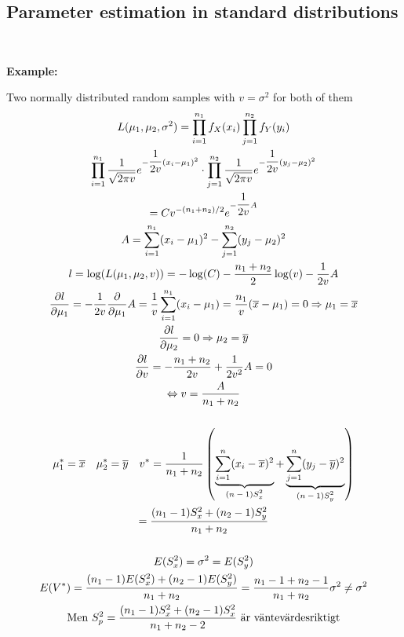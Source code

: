 \subsection{Parameter estimation in standard distributions}\hfill\\\par
\noindent\textbf{Example:}\par
\noindent Two normally distributed random samples with $v = \sigma^2$ for both of them
\begin{equation*}
  \begin{gathered}
    L(\mu_1,\mu_2,\sigma^2) = \prod_{i=1}^{n_1}f_X(x_i)\prod_{j=1}^{n_2}f_Y(y_i)\\
    \prod_{i=1}^{n_1}\dfrac{1}{\sqrt{2\pi v}}e^{-\dfrac{1}{2v}(x_i-\mu_1)^2}\cdot\prod_{j=1}^{n_2}\dfrac{1}{\sqrt{2\pi v}}e^{-\dfrac{1}{2v}(y_j-\mu_2)^2}\\
    = Cv^{-(n_1+n_2)/2}e^{-\dfrac{1}{2v}A}\\
    A = \sum_{i=1}^{n_1}(x_i-\mu_1)^2-\sum_{j=1}^{n_2}(y_j-\mu_2)^2\\
    l = \log(L(\mu_1,\mu_2,v)) = -\log(C)-\dfrac{n_1+n_2}{2}\log(v)-\dfrac{1}{2v}A\\
    \dfrac{\partial l}{\partial \mu_1} = -\dfrac{1}{2v}\dfrac{\partial}{\partial\mu_1}A = \dfrac{1}{v}\sum_{i=1}^{n_1}(x_i-\mu_1) = \dfrac{n_1}{v}(\overline{x}-\mu_1) = 0\Rightarrow \mu_1= \overline{x}\\
    \dfrac{\partial l}{\partial \mu_2} = 0\Rightarrow \mu_2 = \overline{y}\\
    \dfrac{\partial l}{\partial v} = -\dfrac{n_1+n_2}{2v}+\dfrac{1}{2v^2}A = 0\\
    \Leftrightarrow v = \dfrac{A}{n_1+n_2}\\\\
    \mu_1^* = \overline{x}\quad\mu_2^* = \overline{y}\quad v^* = \dfrac{1}{n_1+n_2}\left(\underbrace{\sum_{i=1}^{n}(x_i-\overline{x})^2}_{\text{$(n-1)S_x^2$}}+\underbrace{\sum_{j=1}^{n}(y_j-\overline{y})^2}_{\text{$(n-1)S_y^2$}}\right)\\
    = \dfrac{(n_1-1)S_x^2+(n_2-1)S_y^2}{n_1+n_2}\\\\
    E(S_x^2) = \sigma^2 = E(S_y^2)\\
    E(V^*) = \dfrac{(n_1-1)E(S_x^2)+(n_2-1)E(S_y^2)}{n_1+n_2} = \dfrac{n_1-1+n_2-1}{n_1+n_2}\sigma^2\neq\sigma^2\\
    \text{Men } S_p^2 = \dfrac{(n_1-1)S_x^2+(n_2-1)S_x^2}{n_1+n_2-2}\text{ är väntevärdesriktigt}
  \end{gathered}
\end{equation*}
\newpage
